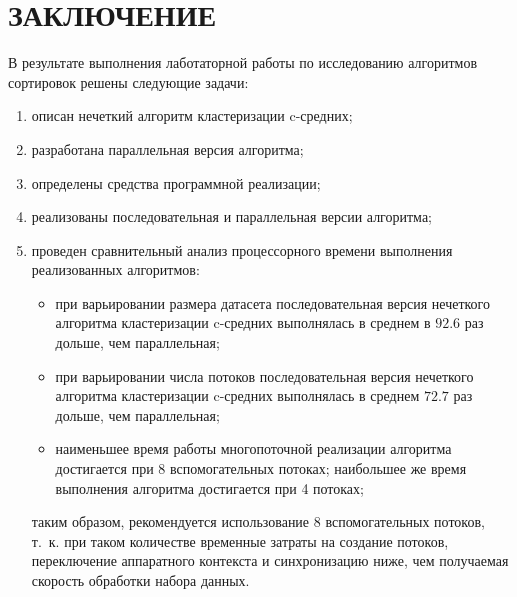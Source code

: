 \chapter*{ЗАКЛЮЧЕНИЕ}

В результате выполнения лаботаторной работы по исследованию алгоритмов сортировок решены следующие задачи:
\begin{enumerate}
	\item описан нечеткий алгоритм кластеризации c-средних;
	\item разработана параллельная версия алгоритма;
	\item определены средства программной реализации;
	\item реализованы последовательная и параллельная версии алгоритма;
	\item проведен сравнительный анализ процессорного времени выполнения реализованных алгоритмов:
	\begin{itemize}
		\item при варьировании размера датасета последовательная версия нечеткого алгоритма кластеризации c-средних выполнялась в среднем в $92.6$ раз дольше, чем параллельная; 
		\item при варьировании числа потоков последовательная версия нечеткого алгоритма кластеризации c-средних выполнялась в среднем $72.7$ раз дольше, чем параллельная;
		\item наименьшее время работы многопоточной реализации алгоритма достигается при 8 вспомогательных потоках; наибольшее же время выполнения алгоритма достигается при 4 потоках;
	\end{itemize}
	таким образом, рекомендуется использование 8 вспомогательных потоков, т.~к. при таком количестве временные затраты на создание потоков, переключение аппаратного контекста и синхронизацию ниже, чем получаемая скорость обработки набора данных.
\end{enumerate}